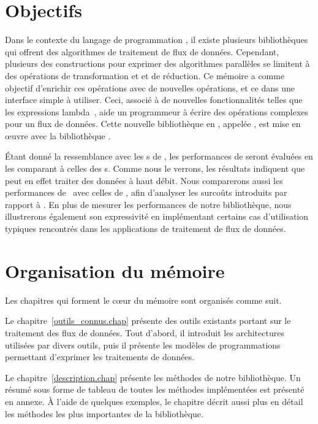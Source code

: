 \begin{introduction}
\section*{Objectifs}


Dans le contexte du langage de programmation , il existe plusieurs biblioth\`eques qui offrent des algorithmes de traitement de flux de donn\'ees. Cependant, plusieurs des constructions pour exprimer des algorithmes parall\`eles se limitent \`a des op\'erations de transformation et et de r\'eduction. Ce m\'emoire a comme objectif d'enrichir ces op\'erations avec de nouvelles op\'erations, et ce dans une interface simple \`a utiliser. Ceci, associ\'e \`a de nouvelles fonctionnalit\'es telles que les expressions lambda~\citep{josuttis2012c++}, aide un programmeur \`a \'ecrire des op\'erations complexes pour un flux de donn\'ees. Cette nouvelle bibliothèque en , appel\'ee ,  est mise en \oe{}uvre avec la biblioth\`eque .


\'Etant donn\'e la ressemblance avec les s de ,
les performances de  seront \'evalu\'ees en les comparant \`a celles des s. Comme nous le verrons, les r\'esultats indiquent que  peut en effet traiter des donn\'ees \`a haut d\'ebit.
%
Nous comparerons aussi les performances de \ppff\ avec celles de
, afin d'analyser les surco\^uts introduits par rapport à .
%
En plus de mesurer les performances de notre bibliothèque, nous illustrerons \'egalement son expressivit\'e en impl\'ementant certains cas d'utilisation typiques rencontr\'es dans les applications de traitement de flux de donn\'ees.


\section*{Organisation du m\'emoire}

Les chapitres qui forment le c\oe{}ur du m\'emoire sont organis\'es
comme suit.


Le chapitre~\ref{outils_connus.chap}  pr\'esente des outils existants portant sur le traitement des flux de donn\'ees.  Tout d'abord, il introduit les architectures utilis\'ees par divers outils, puis il pr\'esente les mod\`eles de programmations permettant d'exprimer les traitements de donn\'ees.

Le chapitre~\ref{description.chap}  pr\'esente les m\'ethodes de notre bibliothèque. Un r\'esum\'e sous forme de tableau de toutes les m\'ethodes implément\'ees est pr\'esent\'e en annexe. À l'aide de quelques exemples, le chapitre d\'ecrit aussi plus en d\'etail les m\'ethodes les plus importantes de la bibliothèque.


\end{introduction}
